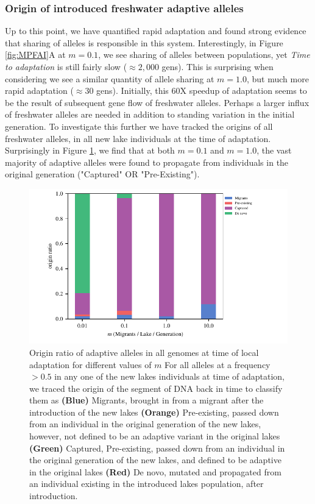 \documentclass{article}
\begin{document}
\subsubsection*{Origin of introduced freshwater adaptive alleles}
Up to this point, we have quantified rapid adaptation and found strong evidence that sharing of alleles is responsible in this system.
Interestingly, in Figure \ref{fig:MPFAI}A at $m = 0.1$, we see sharing of alleles between populations,
yet \emph{Time to adaptation} is still fairly slow ($\approx 2,000$ gens).
This is surprising when considering we see a similar quantity of allele sharing at  $m = 1.0$, 
but much more rapid adaptation ($\approx 30$ gens). 
Initially, this 60X speedup of adaptation seems to be the result of subsequent gene flow of freshwater alleles. 
Perhaps a larger influx of freshwater alleles are needed in addition to standing variation in the initial generation.
To investigate this further we have tracked the origins of all freshwater alleles, in all new lake individuals at the time of adaptation. 
Surprisingly in Figure \ref{fig:Origin}, we find that at both $m = 0.1$ and $m = 1.0$,
the vast majority of adaptive alleles were found to propagate from individuals in the original generation ("Captured" OR "Pre-Existing").

\begin{figure}
	\begin{center}
  		\includegraphics[width=0.7\linewidth]{Final_Plots/Allele_Origin.pdf}
  		\caption{ 
		Origin ratio of adaptive alleles in all genomes at time of local adaptation for different values of $m$
		For all alleles at a frequency $> 0.5$ in any one of the new lakes individuals at time of adaptation, 
		we traced the origin of the segment of DNA back in time to classify them as 
		\textbf{(Blue)} Migrants, brought in from a migrant after the introduction of the new lakes 
		\textbf{(Orange)} Pre-existing, passed down from an individual in the original generation of the new lakes, 
		however, not defined to be an adaptive variant in the original lakes
		\textbf{(Green)} Captured, Pre-existing, passed down from an individual in the original generation of the new lakes, 
		and defined to be adaptive in the original lakes
		\textbf{(Red)} De novo, mutated and propagated from an individual existing in the introduced lakes population, after introduction. 
		}
  		\label{fig:Origin}
	\end{center}
\end{figure}
\end{document}
